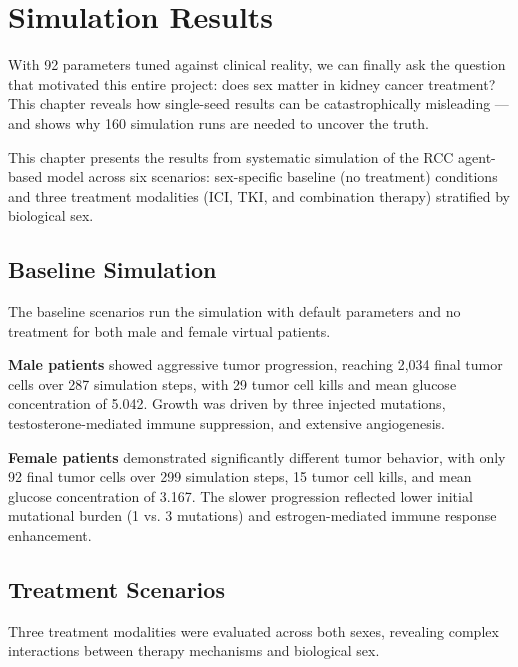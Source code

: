 \chapter{Simulation Results}
\label{ch:simulation-results}

With 92 parameters tuned against clinical reality, we can finally ask the question that motivated this entire project: does sex matter in kidney cancer treatment? This chapter reveals how single-seed results can be catastrophically misleading --- and shows why 160 simulation runs are needed to uncover the truth.

This chapter presents the results from systematic simulation of the RCC agent-based model across six scenarios: sex-specific baseline (no treatment) conditions and three treatment modalities (ICI, TKI, and combination therapy) stratified by biological sex.

\section{Baseline Simulation}
\label{sec:baseline-sim}

The baseline scenarios run the simulation with default parameters and no treatment for both male and female virtual patients.

\textbf{Male patients} showed aggressive tumor progression, reaching 2,034 final tumor cells over 287 simulation steps, with 29 tumor cell kills and mean glucose concentration of 5.042. Growth was driven by three injected mutations, testosterone-mediated immune suppression, and extensive angiogenesis.

\textbf{Female patients} demonstrated significantly different tumor behavior, with only 92 final tumor cells over 299 simulation steps, 15 tumor cell kills, and mean glucose concentration of 3.167. The slower progression reflected lower initial mutational burden (1 vs. 3 mutations) and estrogen-mediated immune response enhancement.

\section{Treatment Scenarios}
\label{sec:treatment-scenarios}

Three treatment modalities were evaluated across both sexes, revealing complex interactions between therapy mechanisms and biological sex.

